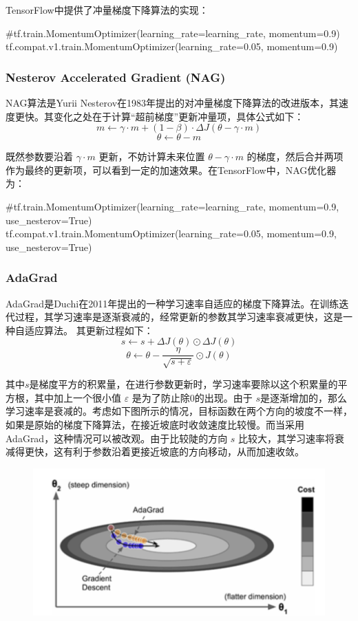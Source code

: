 \documentclass[12pt]{article}
\begin{document}
TensorFlow中提供了冲量梯度下降算法的实现：
\begin{python}
#tf.train.MomentumOptimizer(learning_rate=learning_rate, momentum=0.9)
tf.compat.v1.train.MomentumOptimizer(learning_rate=0.05, momentum=0.9)
\end{python}

\subsubsection{Nesterov Accelerated Gradient (NAG)}
NAG算法是Yurii Nesterov在1983年提出的对冲量梯度下降算法的改进版本，其速度更快。其变化之处在于计算“超前梯度”更新冲量项，具体公式如下：
$$
m \leftarrow \gamma \cdot m + (1-\beta) \cdot \Delta J(\theta - \gamma \cdot m) 
$$
$$
\theta \leftarrow \theta - m
$$

既然参数要沿着 $\gamma \cdot m$ 更新，不妨计算未来位置 $\theta - \gamma \cdot m$ 的梯度，然后合并两项作为最终的更新项，可以看到一定的加速效果。在TensorFlow中，NAG优化器为：
\begin{python}
#tf.train.MomentumOptimizer(learning_rate=learning_rate, momentum=0.9, use_nesterov=True)
tf.compat.v1.train.MomentumOptimizer(learning_rate=0.05, momentum=0.9, use_nesterov=True)
\end{python}

\subsubsection{AdaGrad}
AdaGrad是Duchi在2011年提出的一种学习速率自适应的梯度下降算法。在训练迭代过程，其学习速率是逐渐衰减的，经常更新的参数其学习速率衰减更快，这是一种自适应算法。 其更新过程如下：
$$
s \leftarrow s + \Delta J(\theta) \odot \Delta J(\theta)
$$
$$
\theta \leftarrow \theta - \frac{\eta}{\sqrt{s + \varepsilon}} \odot J(\theta)
$$

其中$s$是梯度平方的积累量，在进行参数更新时，学习速率要除以这个积累量的平方根，其中加上一个很小值 $\varepsilon$ 是为了防止除0的出现。由于 $s$是逐渐增加的，那么学习速率是衰减的。考虑如下图所示的情况，目标函数在两个方向的坡度不一样，如果是原始的梯度下降算法，在接近坡底时收敛速度比较慢。而当采用AdaGrad，这种情况可以被改观。由于比较陡的方向 $s$ 比较大，其学习速率将衰减得更快，这有利于参数沿着更接近坡底的方向移动，从而加速收敛。
\begin{figure}[H]
    \centering
    \includegraphics[width=.6\textwidth]{fig/Gradient_Descent_AdaGrad_Example.png}
\end{figure}
\end{document}

